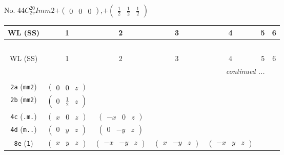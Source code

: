 \documentclass[fleqn,9pt,landscape]{jsarticle}
\begin{document}
\newpage
No. 44\quad$C_{2v}^{20}$\quad$Imm2$\quad[ orthorhombic ]\quad$+\begin{pmatrix} 0 & 0 & 0 \end{pmatrix}$,\quad $+\begin{pmatrix} \frac{1}{2} & \frac{1}{2} & \frac{1}{2} \end{pmatrix}$
\begin{center}
\renewcommand{\arraystretch}{1.2}
\begin{longtable}{ccccccc}
 \hline \hline
WL (SS) & 1 & 2 & 3 & 4 & 5 & 6 \\ \hline \endfirsthead

\multicolumn{6}{l}{\tablename\ \thetable{}} \\
 \hline \hline
WL (SS) & 1 & 2 & 3 & 4 & 5 & 6 \\ \hline \endhead

 \hline \hline
\multicolumn{6}{r}{\footnotesize\it continued ...} \\ \endfoot

 \hline \hline
\multicolumn{6}{r}{} \\ \endlastfoot

{\tt 2a} ({\tt mm2}) & $ \begin{pmatrix} 0 & 0 & z \end{pmatrix} $ & $  $ & $  $ & $  $ \\ \hline
{\tt 2b} ({\tt mm2}) & $ \begin{pmatrix} 0 & \frac{1}{2} & z \end{pmatrix} $ & $  $ & $  $ & $  $ \\ \hline
{\tt 4c} ({\tt .m.}) & $ \begin{pmatrix} x & 0 & z \end{pmatrix} $ & $ \begin{pmatrix} - x & 0 & z \end{pmatrix} $ & $  $ & $  $ \\ \hline
{\tt 4d} ({\tt m..}) & $ \begin{pmatrix} 0 & y & z \end{pmatrix} $ & $ \begin{pmatrix} 0 & - y & z \end{pmatrix} $ & $  $ & $  $ \\ \hline
{\tt 8e} ({\tt 1}) & $ \begin{pmatrix} x & y & z \end{pmatrix} $ & $ \begin{pmatrix} - x & - y & z \end{pmatrix} $ & $ \begin{pmatrix} x & - y & z \end{pmatrix} $ & $ \begin{pmatrix} - x & y & z \end{pmatrix} $ \\
\end{longtable}
\end{center}
\end{document}
